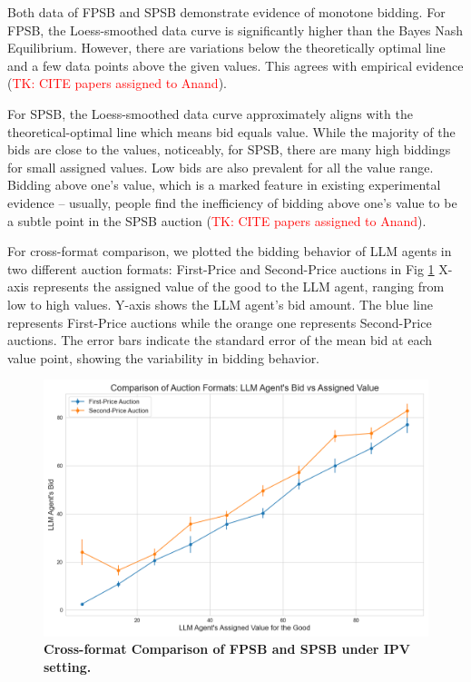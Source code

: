 \documentclass{article} %
\newcommand{\TK}[1]{\textcolor{red}{TK: #1}}
\begin{document}
Both data of FPSB and SPSB demonstrate evidence of monotone bidding.
For FPSB, the Loess-smoothed data curve is significantly higher than the Bayes Nash Equilibrium. However, there are variations below the theoretically optimal line and a few data points above the given values.
This agrees with empirical evidence (\TK{CITE papers assigned to Anand}). 

For SPSB, the Loess-smoothed data curve approximately aligns with the theoretical-optimal line which means bid equals value. While the majority of the bids are close to the values, 
noticeably, for SPSB, there are many high biddings for small assigned values. Low bids are also prevalent for all the value range.
 Bidding above one's value, which is a marked feature in existing experimental evidence -- usually, people find the inefficiency of bidding above one's value to be a subtle point in the SPSB auction (\TK{CITE papers assigned to Anand}).

For cross-format comparison, we plotted the bidding behavior of LLM agents in two different auction formats: First-Price and Second-Price auctions in Fig \ref{fig:cross}
X-axis represents the assigned value of the good to the LLM agent, ranging from low to high values.
Y-axis shows the LLM agent's bid amount.
The blue line represents First-Price auctions while the orange one represents Second-Price auctions.
The error bars indicate the standard error of the mean bid at each value point, showing the variability in bidding behavior.
\begin{figure}[h]
    \centering \includegraphics[width=0.7\linewidth]{Figs/cross-format.png}
    \caption{\textbf{Cross-format Comparison of FPSB and SPSB under IPV setting.} }
    \label{fig:cross}
\end{figure}
\end{document}
